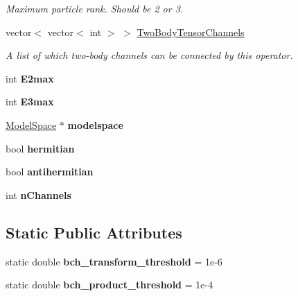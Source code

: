 \begin{DoxyCompactItemize}
\begin{DoxyCompactList}\small\item\em Maximum particle rank. Should be 2 or 3. \end{DoxyCompactList}\item 
\hypertarget{classOperator_aba9a01095cd3e3433716dc74daba4fcc}{vector$<$ vector$<$ int $>$ $>$ \hyperlink{classOperator_aba9a01095cd3e3433716dc74daba4fcc}{Two\-Body\-Tensor\-Channels}}\label{classOperator_aba9a01095cd3e3433716dc74daba4fcc}

\begin{DoxyCompactList}\small\item\em A list of which two-\/body channels can be connected by this operator. \end{DoxyCompactList}\item 
\hypertarget{classOperator_ace64ea3f299cfba00bc973e58ce03414}{int {\bfseries E2max}}\label{classOperator_ace64ea3f299cfba00bc973e58ce03414}

\item 
\hypertarget{classOperator_ad3ebb434f911b9cb7c54ca6990cdda8c}{int {\bfseries E3max}}\label{classOperator_ad3ebb434f911b9cb7c54ca6990cdda8c}

\item 
\hypertarget{classOperator_af08ef1c6d3ef38d08b4a6ea20b26ef22}{\hyperlink{classModelSpace}{Model\-Space} $\ast$ {\bfseries modelspace}}\label{classOperator_af08ef1c6d3ef38d08b4a6ea20b26ef22}

\item 
\hypertarget{classOperator_ad46a54204c51cf5c82e4c489217bd2c1}{bool {\bfseries hermitian}}\label{classOperator_ad46a54204c51cf5c82e4c489217bd2c1}

\item 
\hypertarget{classOperator_a86dd30fca215948dd9307fa45b7a2e32}{bool {\bfseries antihermitian}}\label{classOperator_a86dd30fca215948dd9307fa45b7a2e32}

\item 
\hypertarget{classOperator_a710cd3c6107a4497e90a04c1f3d2b15f}{int {\bfseries n\-Channels}}\label{classOperator_a710cd3c6107a4497e90a04c1f3d2b15f}

\end{DoxyCompactItemize}
\subsection*{Static Public Attributes}
\begin{DoxyCompactItemize}
\item 
\hypertarget{classOperator_af4743d3c6e99ebf1915b348447c8e688}{static double {\bfseries bch\-\_\-transform\-\_\-threshold} = 1e-\/6}\label{classOperator_af4743d3c6e99ebf1915b348447c8e688}

\item 
\hypertarget{classOperator_ad4a2ba438f3286ef22cc06b61f745993}{static double {\bfseries bch\-\_\-product\-\_\-threshold} = 1e-\/4}\label{classOperator_ad4a2ba438f3286ef22cc06b61f745993}

\end{DoxyCompactItemize}


